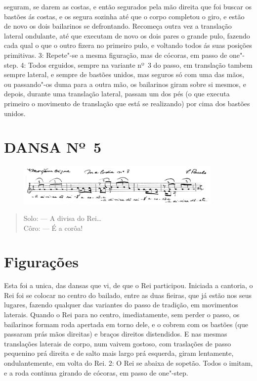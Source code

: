seguram, se darem as costas, e então segurados pela mão direita que foi
buscar os bastões ás costas, e os segura sozinha até que o corpo
completou o giro, e estão de novo os dois bailarinos se defrontando.
Recomeça outra vez a translação lateral ondulante, até que executam de
novo os dois pares o grande pulo, fazendo cada qual o que o outro fizera
no primeiro pulo, e voltando todos ás suas posições primitivas. 3:
Repete"-se a mesma figuração, mas de cócoras, em passo de one"-step. 4:
Todos erguidos, sempre na variante nº~3 do passo, em translação tambem
sempre lateral, e sempre de bastões unidos, mas seguros só com uma das
mãos, ou passando"-os duma para a outra mão, os bailarinos giram sobre si
mesmos, e depois, durante uma translação lateral, passam um dos pés (o
que executa primeiro o movimento de translação que está se realizando)
por cima dos bastões unidos.

\pagebreak

\section*{DANSA Nº~5}

\begin{figure}[!ht]
\centering
 \includegraphics[width=100mm]{./imgs/img7.png}
\end{figure}

\begin{verse}
Solo: --- A divisa do Rei\ldots{}\\
Côro: --- É a corôa!
\end{verse}

\section*{Figurações}

Esta foi a unica, das dansas que vi, de que o Rei participou. Iniciada a
cantoria, o Rei foi se colocar no centro do bailado, entre as duas
fieiras, que já estão nos seus lugares, fazendo qualquer das variantes
do passo de tradição, em movimentos laterais. Quando o Rei para no
centro, imediatamente, sem perder o passo, os bailarinos formam roda
apertada em torno dele, e o cobrem com os bastões (que passaram prás
mãos direitas) e braços direitos distendidos. E nas mesmas translações
laterais de corpo, num vaivem gostoso, com traslações de passo pequenino
prá direita e de salto mais largo prá esquerda, giram lentamente,
ondulantemente, em volta do Rei. 2: O Rei se abaixa de sopetão. Todos o
imitam, e a roda continua girando de cócoras, em passo de one"-step.

